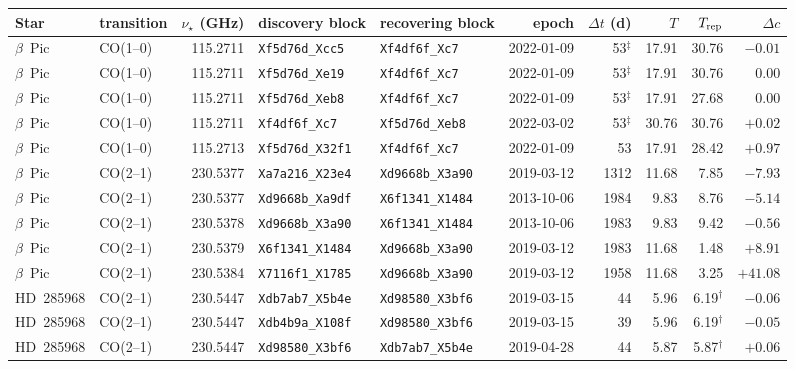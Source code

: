 \begin{tabular}{@{}llrllrrrrr@{}}
\hline
Star & transition & $\nu_\star$ (GHz) & discovery block & recovering block & epoch & $\Delta t$ (d) & $T$ & $T_{\rm rep}$ & $\Delta c$ \\
\hline
$\beta$~Pic & CO(1--0) & 115.2711 & \texttt{Xf5d76d\_Xcc5} & \texttt{Xf4df6f\_Xc7} & 2022-01-09 & 53$^\ddagger$ & 17.91 & 30.76 & $-0.01$ \\
$\beta$~Pic & CO(1--0) & 115.2711 & \texttt{Xf5d76d\_Xe19} & \texttt{Xf4df6f\_Xc7} & 2022-01-09 & 53$^\ddagger$ & 17.91 & 30.76 & $0.00$ \\
$\beta$~Pic & CO(1--0) & 115.2711 & \texttt{Xf5d76d\_Xeb8} & \texttt{Xf4df6f\_Xc7} & 2022-01-09 & 53$^\ddagger$ & 17.91 & 27.68 & $0.00$ \\
$\beta$~Pic & CO(1--0) & 115.2711 & \texttt{Xf4df6f\_Xc7} & \texttt{Xf5d76d\_Xeb8} & 2022-03-02 & 53$^\ddagger$ & 30.76 & 30.76 & $+0.02$ \\
$\beta$~Pic & CO(1--0) & 115.2713 & \texttt{Xf5d76d\_X32f1} & \texttt{Xf4df6f\_Xc7} & 2022-01-09 & 53 & 17.91 & 28.42 & $+0.97$ \\
$\beta$~Pic & CO(2--1) & 230.5377 & \texttt{Xa7a216\_X23e4} & \texttt{Xd9668b\_X3a90} & 2019-03-12 & 1312 & 11.68 & 7.85 & $-7.93$ \\
$\beta$~Pic & CO(2--1) & 230.5377 & \texttt{Xd9668b\_Xa9df} & \texttt{X6f1341\_X1484} & 2013-10-06 & 1984 & 9.83 & 8.76 & $-5.14$ \\
$\beta$~Pic & CO(2--1) & 230.5378 & \texttt{Xd9668b\_X3a90} & \texttt{X6f1341\_X1484} & 2013-10-06 & 1983 & 9.83 & 9.42 & $-0.56$ \\
$\beta$~Pic & CO(2--1) & 230.5379 & \texttt{X6f1341\_X1484} & \texttt{Xd9668b\_X3a90} & 2019-03-12 & 1983 & 11.68 & 1.48 & $+8.91$ \\
$\beta$~Pic & CO(2--1) & 230.5384 & \texttt{X7116f1\_X1785} & \texttt{Xd9668b\_X3a90} & 2019-03-12 & 1958 & 11.68 & 3.25 & $+41.08$ \\
HD~285968 & CO(2--1) & 230.5447 & \texttt{Xdb7ab7\_X5b4e} & \texttt{Xd98580\_X3bf6} & 2019-03-15 & 44 & 5.96 & 6.19$^\dagger$ & $-0.06$ \\
HD~285968 & CO(2--1) & 230.5447 & \texttt{Xdb4b9a\_X108f} & \texttt{Xd98580\_X3bf6} & 2019-03-15 & 39 & 5.96 & 6.19$^\dagger$ & $-0.05$ \\
HD~285968 & CO(2--1) & 230.5447 & \texttt{Xd98580\_X3bf6} & \texttt{Xdb7ab7\_X5b4e} & 2019-04-28 & 44 & 5.87 & 5.87$^\dagger$ & $+0.06$ \\
\hline
\end{tabular}
